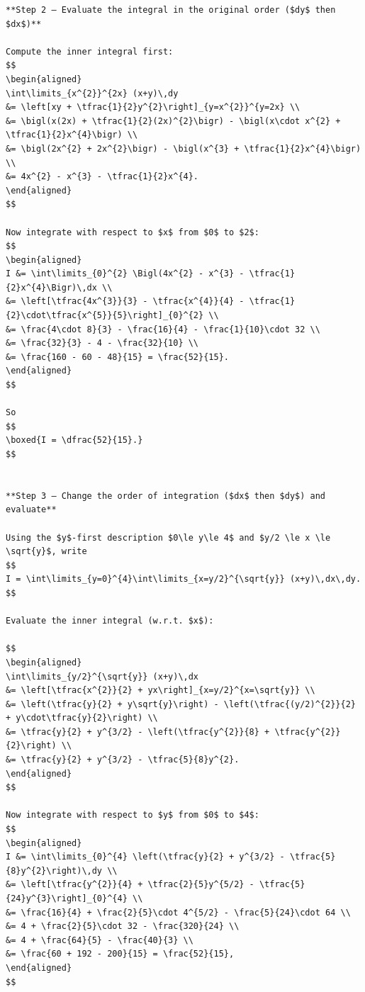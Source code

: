 \documentclass[
  letterpaper,
  DIV=11,
  numbers=noendperiod]{scrreprt}
\begin{document}
\begin{verbatim}
**Step 2 — Evaluate the integral in the original order ($dy$ then $dx$)**

Compute the inner integral first:
$$
\begin{aligned}
\int\limits_{x^{2}}^{2x} (x+y)\,dy
&= \left[xy + \tfrac{1}{2}y^{2}\right]_{y=x^{2}}^{y=2x} \\
&= \bigl(x(2x) + \tfrac{1}{2}(2x)^{2}\bigr) - \bigl(x\cdot x^{2} + \tfrac{1}{2}x^{4}\bigr) \\
&= \bigl(2x^{2} + 2x^{2}\bigr) - \bigl(x^{3} + \tfrac{1}{2}x^{4}\bigr) \\
&= 4x^{2} - x^{3} - \tfrac{1}{2}x^{4}.
\end{aligned}
$$

Now integrate with respect to $x$ from $0$ to $2$:
$$
\begin{aligned}
I &= \int\limits_{0}^{2} \Bigl(4x^{2} - x^{3} - \tfrac{1}{2}x^{4}\Bigr)\,dx \\
&= \left[\tfrac{4x^{3}}{3} - \tfrac{x^{4}}{4} - \tfrac{1}{2}\cdot\tfrac{x^{5}}{5}\right]_{0}^{2} \\
&= \frac{4\cdot 8}{3} - \frac{16}{4} - \frac{1}{10}\cdot 32 \\
&= \frac{32}{3} - 4 - \frac{32}{10} \\
&= \frac{160 - 60 - 48}{15} = \frac{52}{15}.
\end{aligned}
$$

So
$$
\boxed{I = \dfrac{52}{15}.}
$$


**Step 3 — Change the order of integration ($dx$ then $dy$) and evaluate**

Using the $y$-first description $0\le y\le 4$ and $y/2 \le x \le \sqrt{y}$, write
$$
I = \int\limits_{y=0}^{4}\int\limits_{x=y/2}^{\sqrt{y}} (x+y)\,dx\,dy.
$$

Evaluate the inner integral (w.r.t. $x$):

$$
\begin{aligned}
\int\limits_{y/2}^{\sqrt{y}} (x+y)\,dx
&= \left[\tfrac{x^{2}}{2} + yx\right]_{x=y/2}^{x=\sqrt{y}} \\
&= \left(\tfrac{y}{2} + y\sqrt{y}\right) - \left(\tfrac{(y/2)^{2}}{2} + y\cdot\tfrac{y}{2}\right) \\
&= \tfrac{y}{2} + y^{3/2} - \left(\tfrac{y^{2}}{8} + \tfrac{y^{2}}{2}\right) \\
&= \tfrac{y}{2} + y^{3/2} - \tfrac{5}{8}y^{2}.
\end{aligned}
$$

Now integrate with respect to $y$ from $0$ to $4$:
$$
\begin{aligned}
I &= \int\limits_{0}^{4} \left(\tfrac{y}{2} + y^{3/2} - \tfrac{5}{8}y^{2}\right)\,dy \\
&= \left[\tfrac{y^{2}}{4} + \tfrac{2}{5}y^{5/2} - \tfrac{5}{24}y^{3}\right]_{0}^{4} \\
&= \frac{16}{4} + \frac{2}{5}\cdot 4^{5/2} - \frac{5}{24}\cdot 64 \\
&= 4 + \frac{2}{5}\cdot 32 - \frac{320}{24} \\
&= 4 + \frac{64}{5} - \frac{40}{3} \\
&= \frac{60 + 192 - 200}{15} = \frac{52}{15},
\end{aligned}
$$


\end{verbatim}
\end{document}

